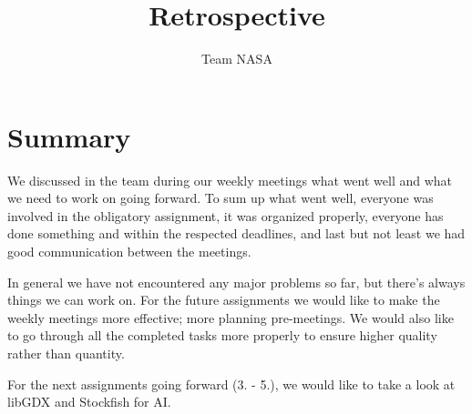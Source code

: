 \documentclass{article}
\title{Retrospective}
\author{Team NASA}
\date{}
\begin{document}
\maketitle

\section * {Summary}
We discussed in the team during our weekly meetings what went well and what we need to work on going forward. To sum up what went well, everyone was involved in the obligatory assignment, it was organized properly, everyone has done something and within the respected deadlines, and last but not least we had good communication between the meetings.

In general we have not encountered any major problems so far, but there’s always things we can work on. For the future assignments we would like to make the weekly meetings more effective; more planning pre-meetings. We would also like to go through all the completed tasks more properly to ensure higher quality rather than quantity.

For the next assignments going forward (3. - 5.), we would like to take a look at libGDX and Stockfish for AI.
\end{document}
